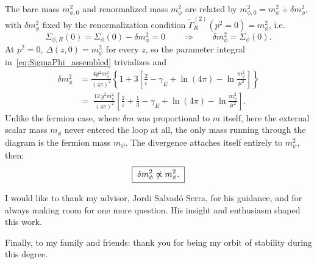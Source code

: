 \documentclass[a4paper, 11pt]{article}
\begin{document}
The bare mass $m_{\phi,0}^2$ and renormalized mass $m_\phi^2$ are related by $m_{\phi,0}^2 = m_\phi^2+\delta m_\phi^2$, with $\delta m_\phi^2$ fixed by the renormalization condition $\widetilde\Gamma_R^{(2)}(p^2{=}0)=m_\phi^2$, i.e.
\begin{equation*}
    \Sigma_{\phi,R}(0) = \Sigma_\phi(0)-\delta m_\phi^2 = 0
    \qquad\Longrightarrow\qquad
    \delta m_\phi^2 = \Sigma_\phi(0).
\end{equation*}
At $p^2=0$, $\Delta(z,0)=m_\psi^2$ for every $z$, so the parameter integral in~\eqref{eq:SigmaPhi_assembled} trivializes and
\begin{align*}
    \delta m_\phi^2 &= \frac{4y^2 m_\psi^2}{(4\pi)^2}
    \left\{1+3\left[\frac{2}{\varepsilon}-\gamma_E+\ln(4\pi)-\ln\frac{m_\psi^2}{\mu^2}\right]\right\}\\
    &=\;
    \frac{12\,y^2 m_\psi^2}{(4\pi)^2}\left[\frac{2}{\varepsilon}+\frac13-\gamma_E+\ln(4\pi)-\ln\frac{m_\psi^2}{\mu^2}\right].
\end{align*}
Unlike the fermion case, where $\delta m$ was proportional to $m$ itself, here the external scalar mass $m_\phi$ never entered the loop at all, the only mass running through the diagram is the fermion mass $m_\psi$. The divergence attaches itself entirely to $m_\psi^2$, then:
\begin{equation*}
    \boxed{\;\delta m_\phi^2 \;\slashed{\propto}\; m_\phi^2.\;}
\end{equation*}

\acknowledgments
I would like to thank my advisor, Jordi Salvadó Serra, for his guidance, and for always making room for one more question. His insight and enthusiasm shaped this work.

\noindent Finally, to my family and friends: thank you for being my orbit of stability during this degree.
\end{document}
